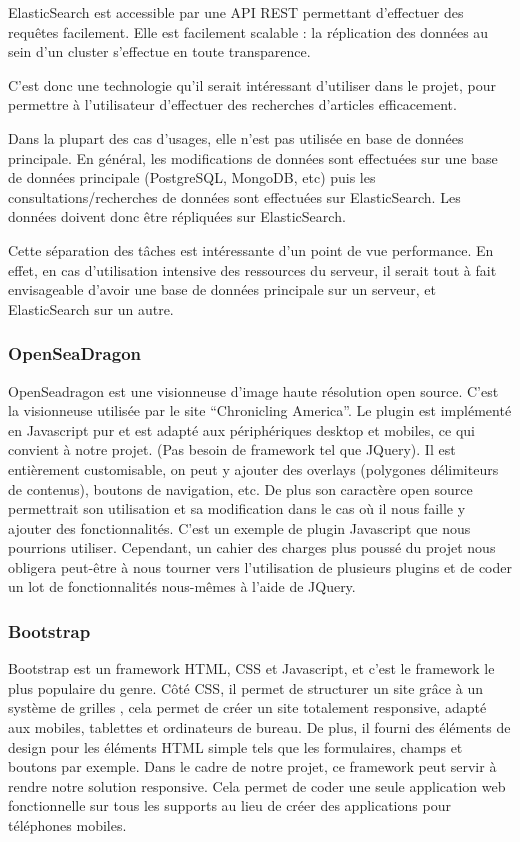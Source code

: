         ElasticSearch est accessible par une API REST permettant d'effectuer des requêtes facilement. Elle est facilement scalable :
        la réplication des données au sein d'un cluster s'effectue en toute transparence.

        C'est donc une technologie qu'il serait intéressant d'utiliser dans le projet, pour permettre à l'utilisateur d'effectuer
        des recherches d'articles efficacement.

        Dans la plupart des cas d'usages, elle n'est pas utilisée en base de données principale. En général, les modifications
        de données sont effectuées sur une base de données principale (PostgreSQL, MongoDB, etc) puis les consultations/recherches
        de données sont effectuées sur ElasticSearch. Les données doivent donc être répliquées sur ElasticSearch.

        Cette séparation des tâches est intéressante d'un point de vue performance. En effet, en cas d'utilisation intensive
        des ressources du serveur, il serait tout à fait envisageable d'avoir une base de données principale sur un serveur,
        et ElasticSearch sur un autre.

        \subsubsection{OpenSeaDragon}
        \label{subsubsec:openseagdragon}
        OpenSeadragon est une visionneuse d’image haute résolution open source. C’est la visionneuse utilisée par le site
        “Chronicling America”. Le plugin est implémenté en Javascript pur et est adapté aux périphériques desktop et mobiles,
        ce qui convient à notre projet. (Pas besoin de framework tel que JQuery). Il est entièrement customisable, on peut
        y ajouter des overlays (polygones délimiteurs de contenus), boutons de navigation, etc. De plus son caractère open
        source permettrait son utilisation et sa modification dans le cas où il nous faille y ajouter des fonctionnalités.
        C’est un exemple de plugin Javascript que nous pourrions utiliser. Cependant, un cahier des charges plus poussé du
        projet nous obligera peut-être à nous tourner vers l’utilisation de plusieurs plugins et de coder un lot de fonctionnalités
        nous-mêmes à l’aide de JQuery.

        \subsubsection{Bootstrap}
        \label{subsubsec:bootstrap}
        Bootstrap est un framework HTML, CSS et Javascript, et c’est le framework le plus populaire du genre.
        Côté CSS, il permet de structurer un site grâce à un système de grilles , cela permet de créer un site
        totalement responsive, adapté aux mobiles, tablettes et ordinateurs de bureau. De plus, il fourni des
        éléments de design pour les éléments HTML simple tels que les formulaires, champs et boutons par exemple.
        Dans le cadre de notre projet, ce framework peut servir à rendre notre solution responsive. Cela permet
        de coder une seule application web fonctionnelle sur tous les supports au lieu de créer des applications
        pour téléphones mobiles.

